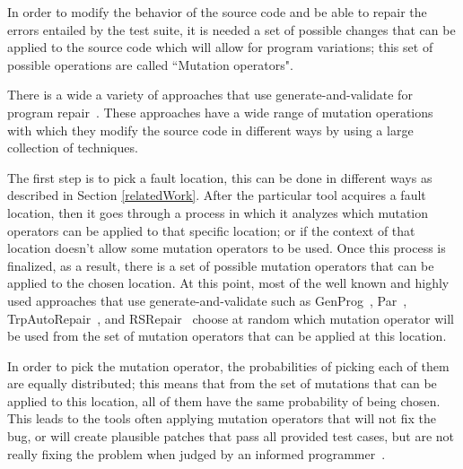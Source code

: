 \documentclass[conference]{IEEEtran}
\newcommand{\todo}[1]
  {{\scriptsize \textbf{\color{red} {#1}}}}
\begin{document}
  



In order to modify the behavior of the source code and be able to repair the 
errors entailed by the test suite, it is needed a set of possible changes that 
can be applied to the source code which will allow for program variations; this 
set of possible operations are called ``Mutation operators". 

There is a wide a variety of approaches that use generate-and-validate for 
program 
repair~\cite{legoues12,kim2013,Weimer13,fan15,long15,debroy10,perkins09,wei10}. 
These approaches 
have a wide range of mutation operations with which they modify the source code 
in different ways by using a large collection of techniques. 

The first step is to pick a fault location, this can be done in different ways as described in Section \ref{relatedWork}. After the particular tool 
acquires a fault location, then
it goes through a process in which it analyzes which mutation operators can
be applied to that specific location; or if the context of that location doesn't
allow some mutation operators to be used. Once this process is finalized, as a result, there is a set of possible 
mutation operators that
can be applied to the chosen location. At this point, most of the well known and highly 
used approaches that use generate-and-validate such as GenProg~\cite{legoues12}, 
Par~\cite{kim2013}, TrpAutoRepair~\cite{Qi13}, and RSRepair~\cite{Qi14} 
choose at random which mutation operator will be used from the set of mutation 
operators that can be applied at this location. 



In order to pick the mutation operator, the probabilities of picking each of
them are equally distributed; this means that from the set of mutations that can 
be applied to this location, all of them have the same probability of being 
chosen. This leads to the tools often applying mutation operators that will not fix the bug, or will create plausible patches that pass all provided 
test cases, but are not really fixing the problem when judged by an informed 
programmer~\cite{Qi15, kim2013}. 
\end{document}
